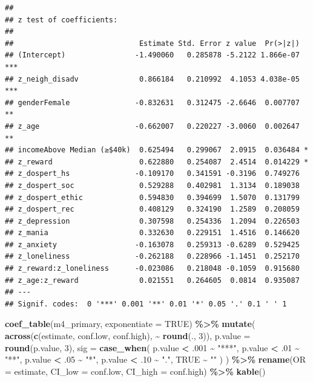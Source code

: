 \documentclass[
]{article}
\newenvironment{Shaded}{\begin{snugshade}}{\end{snugshade}}
\newcommand{\AttributeTok}[1]{\textcolor[rgb]{0.13,0.29,0.53}{#1}}
\newcommand{\ConstantTok}[1]{\textcolor[rgb]{0.56,0.35,0.01}{#1}}
\newcommand{\DecValTok}[1]{\textcolor[rgb]{0.00,0.00,0.81}{#1}}
\newcommand{\FunctionTok}[1]{\textcolor[rgb]{0.13,0.29,0.53}{\textbf{#1}}}
\newcommand{\NormalTok}[1]{#1}
\newcommand{\SpecialCharTok}[1]{\textcolor[rgb]{0.81,0.36,0.00}{\textbf{#1}}}
\newcommand{\StringTok}[1]{\textcolor[rgb]{0.31,0.60,0.02}{#1}}
\begin{document}
\begin{verbatim}
## 
## z test of coefficients:
## 
##                             Estimate Std. Error z value  Pr(>|z|)    
## (Intercept)                -1.490060   0.285878 -5.2122 1.866e-07 ***
## z_neigh_disadv              0.866184   0.210992  4.1053 4.038e-05 ***
## genderFemale               -0.832631   0.312475 -2.6646  0.007707 ** 
## z_age                      -0.662007   0.220227 -3.0060  0.002647 ** 
## incomeAbove Median (≥$40k)  0.625494   0.299067  2.0915  0.036484 *  
## z_reward                    0.622880   0.254087  2.4514  0.014229 *  
## z_dospert_hs               -0.109170   0.341591 -0.3196  0.749276    
## z_dospert_soc               0.529288   0.402981  1.3134  0.189038    
## z_dospert_ethic             0.594830   0.394699  1.5070  0.131799    
## z_dospert_rec               0.408129   0.324190  1.2589  0.208059    
## z_depression                0.307598   0.254336  1.2094  0.226503    
## z_mania                     0.332630   0.229151  1.4516  0.146620    
## z_anxiety                  -0.163078   0.259313 -0.6289  0.529425    
## z_loneliness               -0.262188   0.228966 -1.1451  0.252170    
## z_reward:z_loneliness      -0.023086   0.218048 -0.1059  0.915680    
## z_age:z_reward              0.021551   0.264605  0.0814  0.935087    
## ---
## Signif. codes:  0 '***' 0.001 '**' 0.01 '*' 0.05 '.' 0.1 ' ' 1
\end{verbatim}

\begin{Shaded}
\begin{Highlighting}[]
\FunctionTok{coef\_table}\NormalTok{(m4\_primary, }\AttributeTok{exponentiate =} \ConstantTok{TRUE}\NormalTok{) }\SpecialCharTok{\%\textgreater{}\%}
  \FunctionTok{mutate}\NormalTok{(}
    \FunctionTok{across}\NormalTok{(}\FunctionTok{c}\NormalTok{(estimate, conf.low, conf.high), }\SpecialCharTok{\textasciitilde{}} \FunctionTok{round}\NormalTok{(., }\DecValTok{3}\NormalTok{)),}
    \AttributeTok{p.value =} \FunctionTok{round}\NormalTok{(p.value, }\DecValTok{3}\NormalTok{),}
    \AttributeTok{sig =} \FunctionTok{case\_when}\NormalTok{(}
\NormalTok{      p.value }\SpecialCharTok{\textless{}}\NormalTok{ .}\DecValTok{001} \SpecialCharTok{\textasciitilde{}} \StringTok{"***"}\NormalTok{,}
\NormalTok{      p.value }\SpecialCharTok{\textless{}}\NormalTok{ .}\DecValTok{01}  \SpecialCharTok{\textasciitilde{}} \StringTok{"**"}\NormalTok{,}
\NormalTok{      p.value }\SpecialCharTok{\textless{}}\NormalTok{ .}\DecValTok{05}  \SpecialCharTok{\textasciitilde{}} \StringTok{"*"}\NormalTok{,}
\NormalTok{      p.value }\SpecialCharTok{\textless{}}\NormalTok{ .}\DecValTok{10}  \SpecialCharTok{\textasciitilde{}} \StringTok{"."}\NormalTok{,}
      \ConstantTok{TRUE} \SpecialCharTok{\textasciitilde{}} \StringTok{""}
\NormalTok{    )}
\NormalTok{  ) }\SpecialCharTok{\%\textgreater{}\%}
  \FunctionTok{rename}\NormalTok{(}\AttributeTok{OR =}\NormalTok{ estimate, }\AttributeTok{CI\_low =}\NormalTok{ conf.low, }\AttributeTok{CI\_high =}\NormalTok{ conf.high) }\SpecialCharTok{\%\textgreater{}\%}
  \FunctionTok{kable}\NormalTok{()}
\end{Highlighting}
\end{Shaded}
\end{document}
